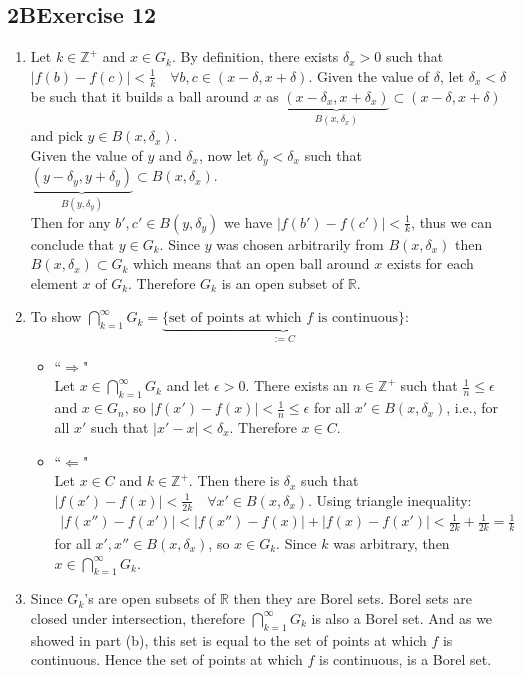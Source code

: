 \documentclass[12pt, letterpaper]{article}
\newcommand{\Z}{\mathbb{Z}}
\newcommand{\R}{\mathbb{R}}
\begin{document}
\subsection*{2\hspace{1pt}B\hspace{20pt}Exercise 12}
\begin{enumerate}[label=(\alph*)]
    \item Let $k\in\Z^+$ and $x\in G_k$. By definition, there exists $\delta_x>0$ such that $|f(b)-f(c)|<\frac{1}{k}\quad \forall b,c\in(x-\delta, x+\delta)$. Given the value of $\delta$, let $\delta_x<\delta$ be such that it builds a ball around $x$ as $\underbrace{(x-\delta_x,x+\delta_x)}_{B(x, \delta_x)}\subset(x-\delta,x+\delta)$ and pick $y\in B(x,\delta_x)$.\\
    Given the value of $y$ and $\delta_x$, now let $\delta_y<\delta_x$ such that $\underbrace{(y-\delta_y,y+\delta_y)}_{B(y, \delta_y)}\subset B(x,\delta_x)$. \\
    Then for any $b',c'\in B(y, \delta_y)$ we have $|f(b')-f(c')|<\frac{1}{k}$, thus we can conclude that $y\in G_k$. Since $y$ was chosen arbitrarily from $B(x, \delta_x)$ then $B(x, \delta_x)\subset G_k$ which means that an open ball around $x$ exists for each element $x$ of $G_k$. Therefore $G_k$ is an open subset of $\R$.

    \item To show $\bigcap_{k=1}^\infty G_k=\underbrace{\{\text{set of points at which $f$ is continuous}\}}_{:=C}$:
    \begin{itemize}[label={}]
        \item``$\bm{\Rightarrow}$"\\
        Let $x\in\bigcap_{k=1}^\infty G_k$ and let $\epsilon>0$. There exists an $n\in\Z^+$ such that $\frac{1}{n}\leq\epsilon$ and $x\in G_n$, so $|f(x')-f(x)|<\frac{1}{n}\leq\epsilon$ for all $x'\in B(x, \delta_x)$, i.e., for all $x'$ such that $|x'-x|<\delta_x$. Therefore $x\in C$.\\
        
        \item``$\bm{\Leftarrow}$"\\
        Let $x\in C$ and $k\in\Z^+$. Then there is $\delta_x$ such that $|f(x')-f(x)|<\frac{1}{2k}\quad \forall x'\in B(x,\delta_x)$. Using triangle inequality:
        \begin{align*}
            |f(x'')-f(x')|<|f(x'')-f(x)|+|f(x)-f(x')|<\frac{1}{2k}+\frac{1}{2k}=\frac{1}{k}
        \end{align*}
        for all $x',x''\in B(x,\delta_x)$, so $x\in G_k$. Since $k$ was arbitrary, then $x\in \bigcap_{k=1}^\infty G_k$.
    \end{itemize}
        
    \item Since $G_k$'s are open subsets of $\R$ then they are Borel sets. Borel sets are closed under intersection, therefore $\bigcap_{k=1}^\infty G_k$ is also a Borel set. And as we showed in part (b), this set is equal to the set of points at which $f$ is continuous. Hence the set of points at which $f$ is continuous, is a Borel set.
\end{enumerate}
\clearpage
\end{document}
